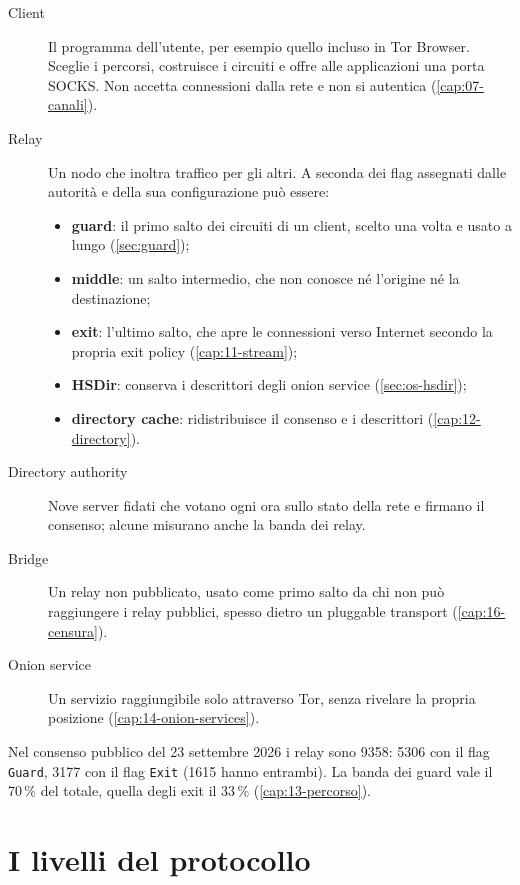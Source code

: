 \begin{description}
  \item[Client] Il programma dell'utente, per esempio quello incluso in Tor Browser. Sceglie i percorsi, costruisce i circuiti e offre alle applicazioni una porta SOCKS. Non accetta connessioni dalla rete e non si autentica (\cref{cap:07-canali}).
  \item[Relay] Un nodo che inoltra traffico per gli altri. A seconda dei flag assegnati dalle autorità e della sua configurazione può essere:
  \begin{itemize}
    \item \textbf{guard}: il primo salto dei circuiti di un client, scelto una volta e usato a lungo (\cref{sec:guard});
    \item \textbf{middle}: un salto intermedio, che non conosce né l'origine né la destinazione;
    \item \textbf{exit}: l'ultimo salto, che apre le connessioni verso Internet secondo la propria exit policy (\cref{cap:11-stream});
    \item \textbf{HSDir}: conserva i descrittori degli onion service (\cref{sec:os-hsdir});
    \item \textbf{directory cache}: ridistribuisce il consenso e i descrittori (\cref{cap:12-directory}).
  \end{itemize}
  \item[Directory authority] Nove server fidati che votano ogni ora sullo stato della rete e firmano il consenso; alcune misurano anche la banda dei relay.
  \item[Bridge] Un relay non pubblicato, usato come primo salto da chi non può raggiungere i relay pubblici, spesso dietro un pluggable transport (\cref{cap:16-censura}).
  \item[Onion service] Un servizio raggiungibile solo attraverso Tor, senza rivelare la propria posizione (\cref{cap:14-onion-services}).
\end{description}

Nel consenso pubblico del 23 settembre 2026 i relay sono 9358: 5306 con il flag \texttt{Guard}, 3177 con il flag \texttt{Exit} (1615 hanno entrambi). La banda dei guard vale il 70\,\% del totale, quella degli exit il 33\,\% (\cref{cap:13-percorso}).

\section{I livelli del protocollo}\label{sec:arch-livelli}

